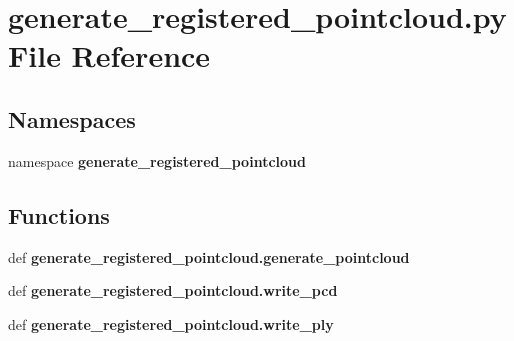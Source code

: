\section{generate\-\_\-registered\-\_\-pointcloud.\-py \-File \-Reference}
\label{generate__registered__pointcloud_8py}
\subsection*{\-Namespaces}
\begin{DoxyCompactItemize}
\item 
namespace {\bf generate\-\_\-registered\-\_\-pointcloud}
\end{DoxyCompactItemize}
\subsection*{\-Functions}
\begin{DoxyCompactItemize}
\item 
def {\bf generate\-\_\-registered\-\_\-pointcloud.\-generate\-\_\-pointcloud}
\item 
def {\bf generate\-\_\-registered\-\_\-pointcloud.\-write\-\_\-pcd}
\item 
def {\bf generate\-\_\-registered\-\_\-pointcloud.\-write\-\_\-ply}
\end{DoxyCompactItemize}
